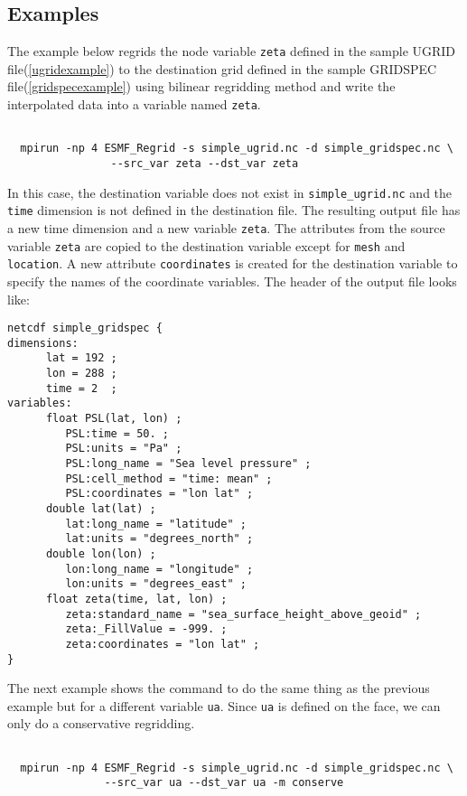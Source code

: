 \subsection{Examples}

The example below regrids the node variable {\tt zeta} defined in the sample UGRID file(\ref{ugridexample}) to 
the destination grid defined in the sample GRIDSPEC file(\ref{gridspecexample}) using bilinear regridding
method and write the interpolated data into a variable named {\tt zeta}.  

\begin{verbatim}

  mpirun -np 4 ESMF_Regrid -s simple_ugrid.nc -d simple_gridspec.nc \
                --src_var zeta --dst_var zeta

\end{verbatim}

In this case, the destination variable does not exist in {\tt simple\_ugrid.nc} and the {\tt time}
dimension is not defined in the destination file.  The resulting output file has a new time dimension and a new variable {\tt zeta}.
The attributes from the source variable {\tt zeta} are copied to the destination variable except for 
{\tt mesh} and {\tt location}.  A new attribute {\tt coordinates} is created for the destination variable to
specify the names of the coordinate variables.  The header of the output file looks like:

\begin{verbatim}
netcdf simple_gridspec {
dimensions:
      lat = 192 ;
      lon = 288 ;
      time = 2  ;
variables:
      float PSL(lat, lon) ;
         PSL:time = 50. ;
         PSL:units = "Pa" ;
         PSL:long_name = "Sea level pressure" ;
         PSL:cell_method = "time: mean" ;
         PSL:coordinates = "lon lat" ;
      double lat(lat) ;
         lat:long_name = "latitude" ;
         lat:units = "degrees_north" ;
      double lon(lon) ;
         lon:long_name = "longitude" ;
         lon:units = "degrees_east" ;
      float zeta(time, lat, lon) ;
         zeta:standard_name = "sea_surface_height_above_geoid" ;
         zeta:_FillValue = -999. ;
         zeta:coordinates = "lon lat" ;
}
\end{verbatim}
  
The next example shows the command to do the same thing as the previous example but for a 
different variable {\tt ua}.  Since {\tt ua} is defined on the face, we can only do a conservative 
regridding.

\begin{verbatim}

  mpirun -np 4 ESMF_Regrid -s simple_ugrid.nc -d simple_gridspec.nc \
               --src_var ua --dst_var ua -m conserve

\end{verbatim}


